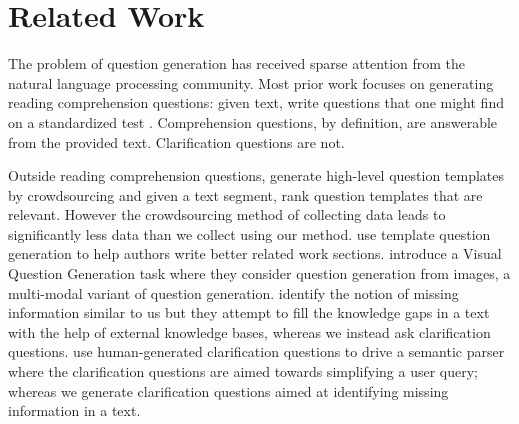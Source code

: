 \documentclass[11pt,a4paper]{article}
\begin{document}
\section{Related Work} \label{related_work}

The problem of question generation has received sparse attention from the natural language processing community. Most prior work focuses on generating reading comprehension questions:  given text, write questions that one might find on a standardized test \cite{vanderwende2008importance,heilman2011automatic,rus2011question,olney2012question}.  Comprehension questions, by definition, are answerable from the provided text. Clarification questions are not.  

Outside reading comprehension questions,  generate high-level question templates by crowdsourcing and given a text segment, rank question templates that are relevant. However the crowdsourcing method of collecting data leads to significantly less data than we collect using our method.  use template question generation to help authors write better related work sections.  introduce a Visual Question Generation task where they consider question generation from images, a multi-modal variant of question generation. 
 identify the notion of missing information similar to us but they attempt to fill the knowledge gaps in a text with the help of external knowledge bases, whereas we instead ask clarification questions.  use human-generated clarification questions to drive a semantic parser where the clarification questions are aimed towards simplifying a user query; whereas we generate clarification questions aimed at  identifying missing information in a text. 

%
\end{document}
